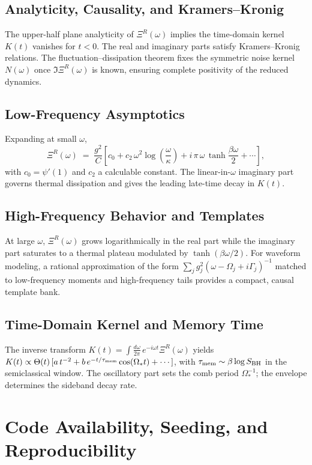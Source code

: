 \documentclass[aps,prd,preprint,onecolumn,superscriptaddress,nofootinbib,longbibliography,floatfix,11pt,showpacs,showkeys]{revtex4-2}
\theoremstyle{plain}
\theoremstyle{definition}
\theoremstyle{remark}
\begin{document}
\subsection{Analyticity, Causality, and Kramers--Kronig}
The upper-half plane analyticity of $\Xi^R(\omega)$ implies the time-domain kernel $K(t)$ vanishes for $t<0$. The real and imaginary parts satisfy Kramers--Kronig relations. The fluctuation--dissipation theorem fixes the symmetric noise kernel $N(\omega)$ once $\Im \Xi^R(\omega)$ is known, ensuring complete positivity of the reduced dynamics.

\subsection{Low-Frequency Asymptotics}
Expanding at small $\omega$,
\begin{equation}
\Xi^R(\omega)\;=\;\frac{g^2}{C}\left[c_0 + c_2\,\omega^2\log\!\left(\frac{\omega}{\kappa}\right)+ i\,\pi\,\omega\,\tanh\!\frac{\beta\omega}{2}+\cdots\right],
\end{equation}
with $c_0=\psi'(1)$ and $c_2$ a calculable constant. The linear-in-$\omega$ imaginary part governs thermal dissipation and gives the leading late-time decay in $K(t)$.

\subsection{High-Frequency Behavior and Templates}
At large $\omega$, $\Xi^R(\omega)$ grows logarithmically in the real part while the imaginary part saturates to a thermal plateau modulated by $\tanh(\beta\omega/2)$. For waveform modeling, a rational approximation of the form $\sum_j g_j^2(\omega-\Omega_j+i\Gamma_j)^{-1}$ matched to low-frequency moments and high-frequency tails provides a compact, causal template bank.

\subsection{Time-Domain Kernel and Memory Time}
The inverse transform $K(t)=\int \frac{d\omega}{2\pi}\,e^{-i\omega t}\Xi^R(\omega)$ yields $K(t)\propto \Theta(t)\,[a\,t^{-2}+b\,e^{-t/\tau_{\rm mem}}\cos(\Omega_\ast t)+\cdots]$, with $\tau_{\rm mem}\sim \beta\log S_{\rm BH}$ in the semiclassical window. The oscillatory part sets the comb period $\Omega_\ast^{-1}$; the envelope determines the sideband decay rate.

\section{Code Availability, Seeding, and Reproducibility}\label{app:code}\label{sec:artifact}\label{sec:repro-box} %
\end{document}
